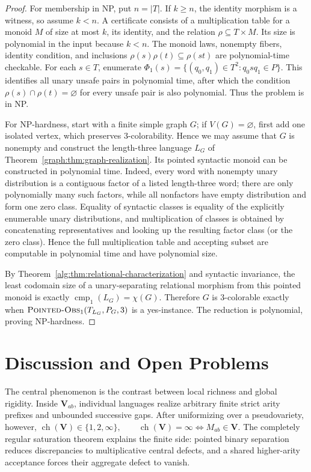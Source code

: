 \documentclass[10pt,a4paper]{article}
\theoremstyle{definition}
\theoremstyle{remark}
\newcommand{\cmp}{\operatorname{cmp}}
\begin{document}
\begin{proof}
For membership in NP, put \(n=|T|\).  If \(k\ge n\), the identity morphism is
a witness, so assume \(k<n\).  A certificate consists of a multiplication
table for a monoid \(M\) of size at most \(k\), its identity, and the relation
\(\rho\subseteq T\times M\).  Its size is polynomial in the input because
\(k<n\).  The monoid laws, nonempty fibers, identity condition, and inclusions
\(\rho(s)\rho(t)\subseteq\rho(st)\) are polynomial-time checkable.
For each \(s\in T\), enumerate
\(\Phi_1(s)=\{(q_0,q_1)\in T^2:q_0sq_1\in P\}.\)
This identifies all unary unsafe pairs in polynomial time, after which the
condition
\(\rho(s)\cap\rho(t)=\varnothing\) for every unsafe pair is also polynomial.
Thus the problem is in NP.

For NP-hardness, start with a finite simple graph \(G\); if \(V(G)=\varnothing\),
first add one isolated vertex, which preserves 3-colorability.  Hence we may assume
that \(G\) is nonempty and construct the length-three language \(L_G\) of
Theorem~\ref{graph:thm:graph-realization}.  Its pointed
syntactic monoid can be constructed in polynomial time.  Indeed, every word
with nonempty unary distribution is a contiguous factor of a listed
length-three word; there are only polynomially many such factors, while all
nonfactors have empty distribution and form one zero class.  Equality of
syntactic classes is equality of the explicitly enumerable unary
distributions, and multiplication of classes is obtained by concatenating
representatives and looking up the resulting factor class (or the zero class).
Hence the full multiplication table and accepting subset are computable in
polynomial time and have polynomial size.

By Theorem~\ref{alg:thm:relational-characterization} and syntactic invariance,
the least codomain size of a unary-separating relational morphism from this
pointed monoid is exactly \(\cmp_1(L_G)=\chi(G)\).  Therefore \(G\) is
3-colorable exactly when
\({\normalfont\textsc{Pointed-Obs}}_1(T_{L_G},P_G,3)\) is a yes-instance.
The reduction is polynomial, proving NP-hardness.
\end{proof}

\section{Discussion and Open Problems}
\label{sec:discussion}

The central phenomenon is the contrast between local richness and global
rigidity.  Inside \(\mathbf V_{ab}\), individual languages realize arbitrary
finite strict arity prefixes and unbounded successive gaps.  After
uniformizing over a pseudovariety, however,
\(\operatorname{ch}(\mathbf V)\in\{1,2,\infty\}, \qquad \operatorname{ch}(\mathbf V)=\infty \Longleftrightarrow M_{ab}\in\mathbf V.\)
The completely regular saturation theorem explains the finite side: pointed
binary separation reduces discrepancies to multiplicative central defects,
and a shared higher-arity acceptance forces their aggregate defect to vanish.
\end{document}
